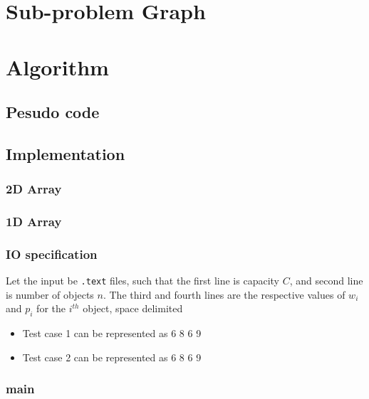 \documentclass{beamer}
\begin{document}
\section{Sub-problem Graph}
\begin{frame}
	
\end{frame}

\section{Algorithm}
\begin{frame}
	
\end{frame}
\subsection{Pesudo code}
\begin{frame}
	
\end{frame}

\subsection{Implementation}
\begin{frame}
	\frametitle{2D Array}
  
\end{frame}

\begin{frame}
	\frametitle{1D Array}
  
\end{frame}

\begin{frame}
  \frametitle{IO specification}
  Let the input be \texttt{.text} files, such that the first line is capacity $C$, and second line is number of objects $n$. The third and fourth lines are the respective values of $w_i$ and $p_i$  for the $i^{th}$ object, space delimited
  \begin{itemize}
    \item Test case 1 can be represented as  6 8 6 9\newline
    \item Test case 2 can be represented as  6 8 6 9\newline
  \end{itemize}
\end{frame}

\begin{frame}
	\frametitle{main}
  
\end{frame}
\end{document}

